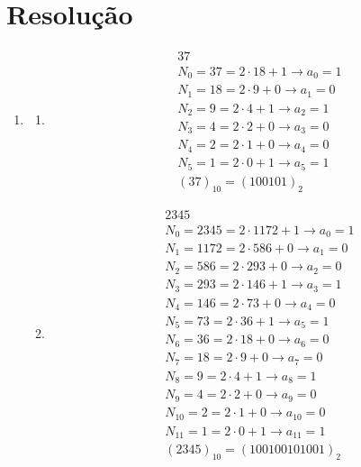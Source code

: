 \documentclass{article}
\begin{document}
\section*{Resolução}
\begin{enumerate}
\item 
\begin{enumerate}
    \item 
        \begin{align*}
        &37 \\
        &N_0 = 37 = 2\cdot18 + 1 \xrightarrow{} a_0 = 1 \\ 
        &N_1 = 18 = 2\cdot9 + 0 \xrightarrow{} a_1 = 0  \\
        &N_2 = 9 = 2\cdot4 + 1 \xrightarrow{} a_2 = 1  \\
        &N_3 = 4 = 2\cdot2 + 0 \xrightarrow{} a_3 = 0  \\
        &N_4 = 2 = 2\cdot1 + 0 \xrightarrow{} a_4 = 0  \\
        &N_5 = 1 = 2\cdot0 + 1 \xrightarrow{} a_5 = 1  \\
        &(37)_10 = (100101)_2
        \end{align*}
    \item 
        \begin{align*}
        &2345 \\
        &N_0 = 2345 = 2\cdot1172 + 1 \xrightarrow{} a_0 = 1 \\ 
        &N_1 = 1172 = 2\cdot586 + 0 \xrightarrow{} a_1 = 0 \\ 
        &N_2 = 586 = 2\cdot293 + 0  \xrightarrow{} a_2 = 0 \\ 
        &N_3 = 293 = 2\cdot146 + 1 \xrightarrow{} a_3 = 1 \\ 
        &N_4 = 146 = 2\cdot73 + 0  \xrightarrow{} a_4 = 0 \\ 
        &N_5 = 73 = 2\cdot36 + 1 \xrightarrow{} a_5 = 1 \\ 
        &N_6 = 36 = 2\cdot18 + 0 \xrightarrow{} a_6 = 0 \\ 
        &N_7 = 18 = 2\cdot9 + 0 \xrightarrow{} a_7 = 0 \\ 
        &N_8 = 9 = 2\cdot4 + 1 \xrightarrow{} a_8 = 1  \\
        &N_9 = 4 = 2\cdot2 + 0 \xrightarrow{} a_9 = 0  \\
        &N_10 = 2 = 2\cdot1 + 0 \xrightarrow{} a_10 = 0  \\
        &N_11 = 1 = 2\cdot0 + 1 \xrightarrow{} a_11 = 1  \\
        &(2345)_10 = (100100101001)_2

\end{align*}
\end{enumerate}
\end{enumerate}
\end{document}

